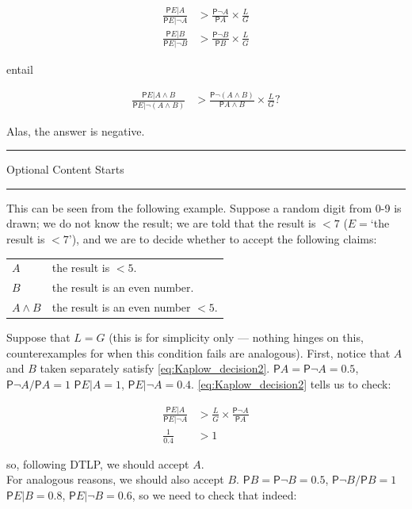 \documentclass[10pt,dvipsnames,enabledeprecatedfontcommands]{scrartcl}
\newcommand{\n}{\neg}
\newcommand{\et}{\wedge}
\newcommand{\pr}{\mathsf{P}}
\newcommand{\intermezzoa}{
	\begin{minipage}[c]{13cm}
	\begin{center}\rule{10cm}{0.4pt}



	\tiny{\sc Optional Content Starts}
	
	\vspace{-1mm}
	
	\rule{10cm}{0.4pt}\end{center}
	\end{minipage}\nopagebreak 
	}
\begin{document}
\begin{align*}
 \frac{\pr{E\vert A}}{\pr{E\vert \n A}}  & > \frac{\pr{\n A}}{\pr{A}} \times \frac{L}{G}\\
 \frac{\pr{E\vert B}}{\pr{E\vert \n B}}  & > \frac{\pr{\n B}}{\pr{B}} \times \frac{L}{G}
 \end{align*}

\noindent entail

\begin{align*}
 \frac{\pr{E\vert A\et B}}{\pr{E\vert \n (A\et B)}}  & > \frac{\pr{\n (A\et B)}}{
 \pr{A\et B}} \times \frac{L}{G}?
 \end{align*}

Alas, the answer is negative.

\intermezzoa

This can be seen from the following example. Suppose a random digit from
0-9 is drawn; we do not know the result; we are told that the result is
\(<7\) (\(E=\)`the result is \(<7\)'), and we are to decide whether to
accept the following claims:

\begin{center}
 \begin{tabular}{@{}ll@{}}
 \toprule
 $A$ & the result is $<5$. \\
 $B$  & the result is an even number.\\
 $A\et B$ & the result is an even number $<5$. \\
 \bottomrule
 \end{tabular}
 \end{center}

Suppose that \(L=G\) (this is for simplicity only --- nothing hinges on
this, counterexamples for when this condition fails are analogous).
First, notice that \(A\) and \(B\) taken separately satisfy
\eqref{eq:Kaplow_decision2}. \(\pr{A}=\pr{\n A}=0.5\),
\(\pr{\n A}/\pr{A}=1\) \(\pr{E\vert A}=1\), \(\pr{E\vert \n A}=0.4\).
\eqref{eq:Kaplow_decision2} tells us to check:

\begin{align*}
 \frac{\pr{E\vert A}}{\pr{E\vert \n A}}&> \frac{L}{G}\times \frac{\pr{\n A}}{\pr{A}}\\
 \frac{1}{0.4} & > 1
 \end{align*}

\noindent so, following DTLP, we should accept \(A\).\\
For analogous reasons, we should also accept \(B\).
\(\pr{B}=\pr{\n B}=0.5\), \(\pr{\n B}/\pr{B}=1\) \(\pr{E\vert B}=0.8\),
\(\pr{E\vert \n B}=0.6\), so we need to check that indeed:
\end{document}
